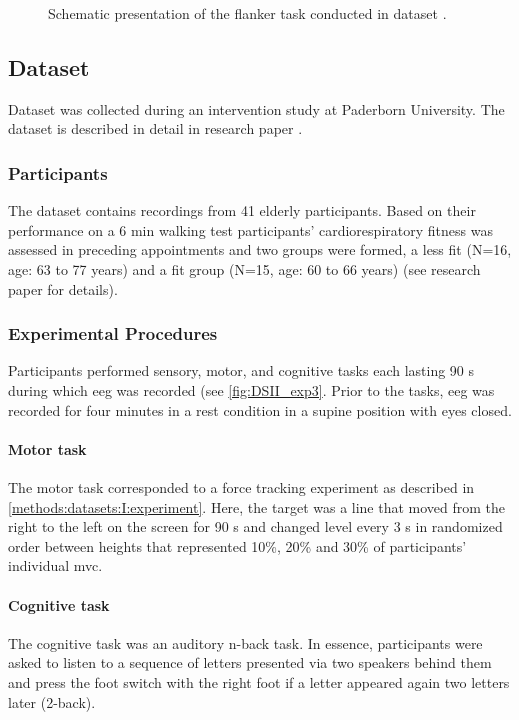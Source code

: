 \begin{figure}[h]
\begin{center}

\caption[Schematic presentation of the flanker task conducted in dataset .]{Schematic presentation of the flanker task conducted in dataset .}
\label{fig:DSII_exp2}
\end{center}
\end{figure}

\subsection{Dataset }
\label{methods:datasets:III}
Dataset  was collected during an intervention study at Paderborn University. The dataset is described in detail in research paper  \cite{Goelz2021b}. 

\subsubsection{Participants}
\label{methods:datasets:III:participants}
The dataset contains recordings from 41 elderly participants. Based on their performance on a 6 min walking test participants’ cardiorespiratory fitness was assessed in preceding appointments and two groups were formed, a less fit (N=16, age: 63 to 77 years) and a fit group (N=15, age: 60 to 66 years) (see research paper  \cite{Goelz2021b} for details).

\subsubsection{Experimental Procedures}
\label{methods:datasets:II:experiment}
Participants performed sensory, motor, and cognitive tasks each lasting 90 s during which \gls{eeg} was recorded (see \autoref{fig:DSII_exp3}. Prior to the tasks, \gls{eeg} was recorded for four minutes in a rest condition in a supine position with eyes closed. 
\paragraph{Motor task} 
The motor task corresponded to a force tracking experiment as described in \autoref{methods:datasets:I:experiment}. Here, the target was a line that moved from the right to the left on the screen for 90 s and changed level every 3 s in randomized order between heights that represented 10\%, 20\% and 30\% of participants' individual \gls{mvc}.
\paragraph{Cognitive task}
The cognitive task was an auditory n-back task. In essence, participants were asked to listen to a sequence of letters presented via two speakers behind them and press the foot switch with the right foot if a letter appeared again two letters later (2-back).
